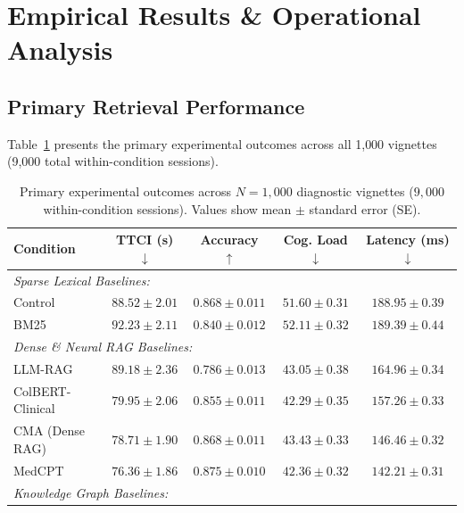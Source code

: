 \documentclass[10pt, onecolumn]{article}
\begin{document}
\section{Empirical Results \& Operational Analysis}
\label{sec:results}

\subsection{Primary Retrieval Performance}

Table~\ref{tab:primary_results} presents the primary experimental outcomes across all 1{,}000 vignettes (9{,}000 total within-condition sessions). 

\begin{table}[t]
  \centering
  \caption{Primary experimental outcomes across $N=1{,}000$ diagnostic vignettes ($9{,}000$ within-condition sessions). Values show mean $\pm$ standard error (SE).}
  \label{tab:primary_results}
  \small
  \begin{tabular}{@{}lcccc@{}}
    \toprule
    \textbf{Condition} & \textbf{TTCI (s)} $\downarrow$ & \textbf{Accuracy} $\uparrow$ & \textbf{Cog. Load} $\downarrow$ & \textbf{Latency (ms)} $\downarrow$ \\
    \midrule
    \multicolumn{5}{l}{\textit{Sparse Lexical Baselines:}} \\
    Control  & $88.52 \pm 2.01$ & $0.868 \pm 0.011$ & $51.60 \pm 0.31$ & $188.95 \pm 0.39$ \\
    BM25     & $92.23 \pm 2.11$ & $0.840 \pm 0.012$ & $52.11 \pm 0.32$ & $189.39 \pm 0.44$ \\
    \midrule
    \multicolumn{5}{l}{\textit{Dense \& Neural RAG Baselines:}} \\
    LLM-RAG \cite{eickhoff2024ehrrag}  & $89.18 \pm 2.36$ & $0.786 \pm 0.013$ & $43.05 \pm 0.38$ & $164.96 \pm 0.34$ \\
    ColBERT-Clinical \cite{santhanam2022colbertv2} & $79.95 \pm 2.06$ & $0.855 \pm 0.011$ & $42.29 \pm 0.35$ & $157.26 \pm 0.33$ \\
    CMA (Dense RAG) \cite{lewis2020retrieval} & $78.71 \pm 1.90$ & $0.868 \pm 0.011$ & $43.43 \pm 0.33$ & $146.46 \pm 0.32$ \\
    MedCPT \cite{jin2023medcpt}       & $76.36 \pm 1.86$ & $0.875 \pm 0.010$ & $42.36 \pm 0.32$ & $142.21 \pm 0.31$ \\
    \midrule
    \multicolumn{5}{l}{\textit{Knowledge Graph Baselines:}} \\

\end{tabular}
\end{table}
\end{document}
